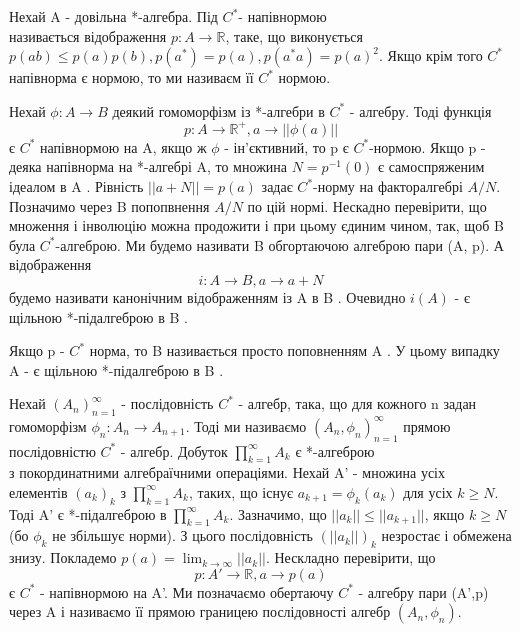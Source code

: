 \begin{definition}
    Нехай A - довільна *-алгебра.
    Під $C^*$- напівнормою \\
    називається відображення $p: A \rightarrow \mathbb{R}$, таке, що виконується \\
    $p(ab) \leq p(a)p(b), p(a^*) = p(a), p(a^* a) = p(a)^2$.
    Якщо крім того $C^*$ напівнорма є нормою, то ми називаєм її $C^*$ нормою.
\end{definition}
Нехай $\phi: A \rightarrow B$ деякий гомоморфізм із *-алгебри в $C^*$ - алгебру.
Тоді функція
\begin{equation*}
    p: A \rightarrow \mathbb{R}^+, a \rightarrow ||\phi(a)||
\end{equation*}
є $C^*$ напівнормою на A, якщо ж $\phi$ - ін'єктивний, то p є $C^*$-нормою.
Якщо p - деяка напівнорма на *-алгебрі A, то множина $N = p^{-1}(0)$ є самоспряженим ідеалом в A .
Рівність $||a + N|| = p(a)$ задає $C^*$-норму на факторалгебрі $A / N$.
Позначимо через B попопвнення $A / N$ по цій нормі.
Нескадно перевірити, що множення і інволюцію можна продожити і при цьому єдиним чином, так, щоб B була $C^*$-алгеброю.
Ми будемо називати B обгортаючою алгеброю пари (A, p).
А відображення
\begin{equation*}
    i: A \rightarrow B, a \rightarrow a + N
\end{equation*}
будемо називати канонічним відображенням із A в B .
Очевидно $i(A)$ - є щільною *-підалгеброю в B .

Якщо p - $C^*$ норма, то B називається просто поповненням A .
У цьому випадку A - є щільною *-підалгеброю в B .

\begin{definition}
    Нехай $(A_n)_{n=1}^{\infty}$ - послідовність $C^*$ - алгебр, така, що для кожного n задан гомоморфізм $\phi_n: A_n \rightarrow A_{n+1}$.
    Тоді ми називаємо $(A_n, \phi_n)_{n=1}^{\infty}$ прямою послідовністю $C^*$ - алгебр.
    Добуток $\prod_{k=1}^{\infty} A_k$ є *-алгеброю \\
    з покординатними алгебраїчними операціями.
    Нехай A' - множина усіх \\ елементів $(a_k)_k$ з $\prod_{k=1}^{\infty} A_k$,
    таких, що існує $a_{k+1} = \phi_k(a_k)$ для усіх $k \geq N$.
    Тоді A' є *-підалгеброю в $\prod_{k=1}^{\infty} A_k$.
    Зазначимо, що $||a_k|| \leq ||a_{k+1}||$, якщо $k \geq N$(бо $\phi_k$ не збільшує норми).
    З цього послідовність $(||a_k||)_k$ незростає і обмежена знизу.
    Покладемо $p(a) = \lim_{k \to \infty} ||a_k||$.
    Нескладно перевірити, що
    \begin{equation*}
        p: A' \rightarrow \mathbb{R}, a \rightarrow p(a)
    \end{equation*}
    є $C^*$ - напівнормою на A'.
    Ми позначаємо обертаючу $C^*$ - алгебру пари (A',p) через A і називаємо її прямою границею послідовності алгебр $(A_n, \phi_n)$.
\end{definition}

